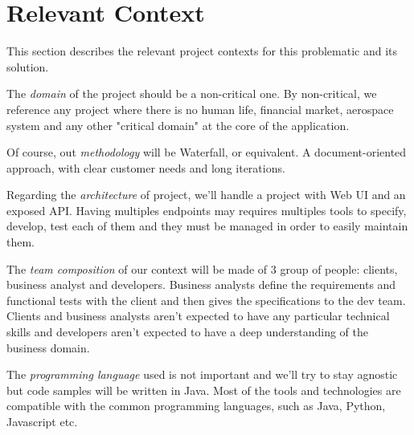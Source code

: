 \section{Relevant Context}\label{sec:relevant-context}
This section describes the relevant project contexts for this problematic
and its solution.

The \textit{domain} of the project should be a non-critical one.
By non-critical, we reference any project where there is no human life,
financial market, aerospace system and any other "critical domain" at
the core of the application.

Of course, out \textit{methodology} will be Waterfall, or equivalent.
A document-oriented approach, with clear customer needs and long iterations.

Regarding the \textit{architecture} of project, we'll handle a project with
Web UI and an exposed API\@.
Having multiples endpoints may requires multiples tools to specify, develop,
test each of them and they must be managed in order to easily maintain them.

The \textit{team composition} of our context will be made of 3 group of people:
clients, business analyst and developers.
Business analysts define the requirements and functional tests with the client
and then gives the specifications to the dev team.
Clients and business analysts aren't expected to have any particular technical
skills and developers aren't expected to have a deep understanding of the
business domain.

The \textit{programming language} used is not important and we'll try to stay
agnostic but code samples will be written in Java.
Most of the tools and technologies are compatible with the common programming
languages, such as Java, Python, Javascript etc.